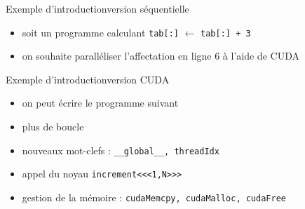 \documentclass[11pt,mathserif]{beamer}
\newcommand{\galde}{\faQuestion}
\newcommand{\argi}{\faLightbulbO}
\newcommand{\pozik}{\faSmileO}
\newcommand{\adibi}{\faCommentO}
\newif\ifC
\newcommand{\mylang}{C}
\newcommand{\extlang}{c}
\newcommand{\extcu}{cu}
\newcommand{\mylang}{fortran}
\newcommand{\extlang}{f90}
\newcommand{\extcu}{cuf}
\newcommand{\includeSrc}[1]{}
\newcommand{\includeSrcCu}[1]{}
\begin{document}
\begin{frame}{Exemple d'introduction}{version séquentielle}
\pause
\begin{itemize}[<+->]
  \item[\adibi] soit un programme calculant \texttt{tab[:]} $\leftarrow$ \texttt{tab[:] + 3}
  \includeSrc{code/increment}
\ifC
   \item[\galde] on souhaite paralléliser la boucle en ligne 6 à l'aide de CUDA
\else
   \item[\galde] on souhaite paralléliser l'affectation en ligne 6 à l'aide de CUDA
\fi
\end{itemize}
\end{frame}

\begin{frame}{Exemple d'introduction}{version CUDA}
\pause
\begin{itemize}[<+->]
  \item[\adibi] on peut écrire le programme suivant
\includeSrcCu{code/increment}
\item[\pozik] plus de boucle
\item[\argi] nouveaux mot-clefs : \texttt{\_\_global\_\_, threadIdx}
\item[\argi] appel du noyau \texttt{increment<<<1,N>>>}
\item[\argi] gestion de la mémoire : \texttt{\small cudaMemcpy, cudaMalloc, cudaFree}
\end{itemize}
\end{frame}
\end{document}

